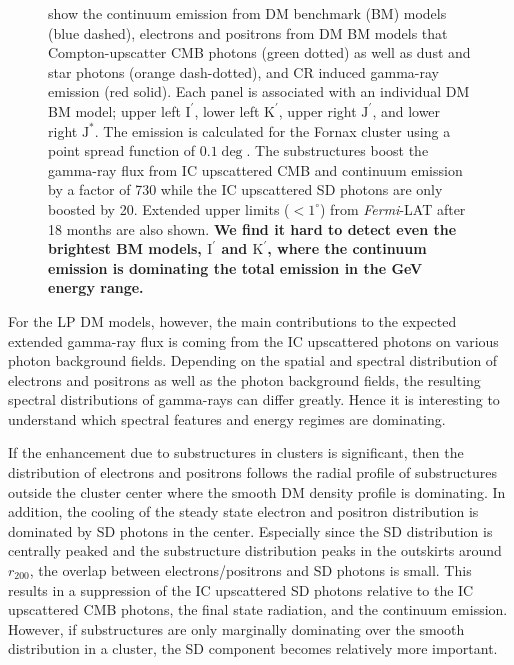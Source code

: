 \documentclass[10pt,aps,pra,reprint,amsmath,amsfonts,amssymb,showpacs,nofootinbib,floatfix]{revtex4-1}
\def\C#1{{\bf #1}}
\newcommand{\Fermi}{{\em Fermi}\xspace}
\newcommand{\rmn}{\mathrm}
\newcommand{\Kp}{\rmn{K}^\prime}
\newcommand{\Ip}{\rmn{I}^\prime}
\newcommand{\Js}{\rmn{J}^*}
\newcommand{\Jp}{\rmn{J}^\prime}
\newcommand{\rvir}{r_{200}}
\begin{document}
\begin{figure}
\begin{minipage}{2.0\columnwidth}
{  show the continuum emission from DM benchmark (BM) models (blue
  dashed), electrons and positrons from DM BM models that
  Compton-upscatter CMB photons (green dotted) as well as dust and
  star photons (orange dash-dotted), and CR induced gamma-ray emission
  (red solid). Each panel is associated with an individual DM BM
  model; upper left $\Ip$, lower left $\Kp$, upper right $\Jp$, and
  lower right $\Js$. The emission is calculated for the Fornax cluster
  using a point spread function of $0.1\deg$. The substructures boost
  the gamma-ray flux from IC upscattered CMB and continuum emission by
  a factor of 730 while the IC upscattered SD photons are only boosted
  by 20. Extended upper limits ($<1^\circ$) from \Fermi-LAT after 18 months \protect
  \cite{2010ApJ...717L..71A} are also shown. \C{We find it hard to
    detect even the brightest BM models, $\Ip$ and $\Kp$, where the
    continuum emission is dominating the total emission in the
    GeV energy range.}}
 \label{fig:diff_BM}
\end{minipage}
\end{figure}

For the LP DM models, however, the main contributions
to the expected extended gamma-ray flux is coming from the IC
upscattered photons on various photon background fields. Depending on
the spatial and spectral distribution of electrons and positrons as
well as the photon background fields, the resulting spectral
distributions of gamma-rays can differ greatly. Hence it is interesting
to understand which spectral features and energy regimes are
dominating.

If the enhancement due to substructures in clusters is significant,
then the distribution of electrons and positrons follows the radial
profile of substructures outside the cluster center where the smooth
DM density profile is dominating. In addition, the cooling of the
steady state electron and positron distribution is dominated by SD
photons in the center. Especially since the SD distribution is
centrally peaked and the substructure distribution peaks in the
outskirts around $\rvir$, the overlap between electrons/positrons and
SD photons is small. This results in a suppression of the IC
upscattered SD photons relative to the IC upscattered CMB photons, the
final state radiation, and the continuum emission. However, if
substructures are only marginally dominating over the smooth
distribution in a cluster, the SD component becomes relatively more
important.
\end{document}
